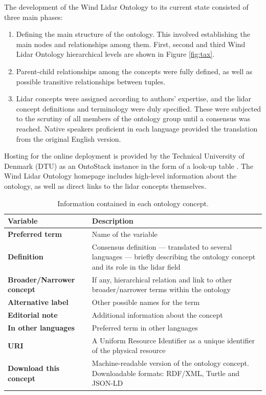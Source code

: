 \documentclass[remotesensing,article,submit,pdftex,moreauthors]{Definitions/mdpi}
\begin{document}
The development of the Wind Lidar Ontology to its current state consisted of three main phases: 
\begin{enumerate}[]

    \item Defining the main structure of the ontology. This involved establishing the main nodes and relationships among them. First, second and third Wind Lidar Ontology hierarchical levels are shown in Figure \ref{fig:tax}. 

    \item Parent-child relationships among the concepts were fully defined, as well as possible transitive relationships between tuples.

    \item
    Lidar concepts were assigned according to authors' expertise, and the lidar concept definitions and terminology were duly specified. These were subjected to the scrutiny of all members of the ontology group until a consensus was reached. Native speakers proficient in each language provided the translation from the original English version.

\end{enumerate}

Hosting for the online deployment is provided by the Technical University of Denmark (DTU) as an OntoStack instance in the form of a look-up table \cite{TCP32_GitHub_repo}.
The Wind Lidar Ontology homepage includes high-level information about the ontology, as well as direct links to the lidar concepts themselves.

\begin{table}[H] 
\caption{Information contained in each ontology concept.
\label{Ontology_var}}
{\def\arraystretch{2}\tabcolsep=11pt
\begin{tabularx}{\textwidth}{lX}
\toprule
\toprule
\textbf{Variable}&\textbf{Description}		\\
\midrule
\midrule
\textbf{Preferred term}	& 	Name of the variable\\
\hline
\textbf{Definition}	& Consensus definition --- translated to several languages --- briefly describing the ontology concept and its role in the lidar field\\
\hline
\textbf{Broader/Narrower concept}	& If any, hierarchical relation and link to other broader/narrower terms within the ontology\\
\hline
\textbf{Alternative label}	& Other possible names for the term\\
\hline
\textbf{Editorial note}	&  Additional information about the concept \\
\hline
\textbf{In other languages}	& Preferred term in other languages\\
\hline
\textbf{URI}	& A Uniform Resource Identifier as a unique identifier of the physical resource\\
\hline
\textbf{Download this concept} & Machine-readable version of the ontology concept. Downloadable formats: RDF/XML, Turtle and JSON-LD\\
\bottomrule
\bottomrule
\end{tabularx}
}
\end{table}
\end{document}
